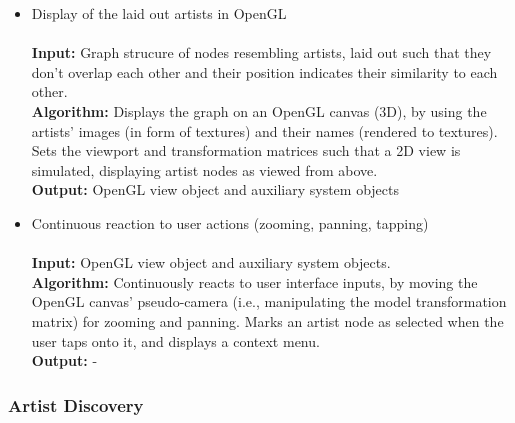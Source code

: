 \begin{itemize}
	\item Display of the laid out artists in OpenGL	\\\\
				\textbf{Input:} Graph strucure of nodes resembling artists, laid out such that they don't 
				overlap each other and their position indicates their similarity to each other. \\
				\textbf{Algorithm:} Displays the graph on an OpenGL canvas (3D), by using the artists' images (in form
				of textures) and their names (rendered to textures). Sets the viewport and transformation
				matrices such that a 2D view is simulated, displaying artist nodes as viewed from above. \\
				\textbf{Output:} OpenGL view object and auxiliary system objects \\
				
	\item Continuous reaction to user actions (zooming, panning, tapping) \\\\
				\textbf{Input:} OpenGL view object and auxiliary system objects. \\
				\textbf{Algorithm:} Continuously reacts to user interface inputs, by moving the OpenGL canvas'
				pseudo-camera (i.e., manipulating the model transformation matrix) for zooming and panning.
				Marks an artist node as selected when the user taps onto it, and displays a context menu. \\
				\textbf{Output:} -
\end{itemize}

\subsubsection{Artist Discovery}

